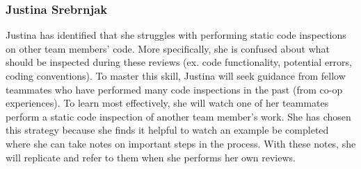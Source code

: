 \documentclass[12pt, titlepage]{article}
\begin{document}
	\subsubsection*{Justina Srebrnjak}
	Justina has identified that she struggles with performing static code inspections on other team members' code. More specifically, she is confused about what should be inspected during these reviews (ex. code functionality, potential errors, coding conventions). To master this skill, Justina will seek guidance from fellow teammates who have performed many code inspections in the past (from co-op experiences). To learn most effectively, she will watch one of her teammates perform a static code inspection of another team member's work. She has chosen this strategy because she finds it helpful to watch an example be completed where she can take notes on important steps in the process. With these notes, she will replicate and refer to them when she performs her own reviews.
	
\end{document}
